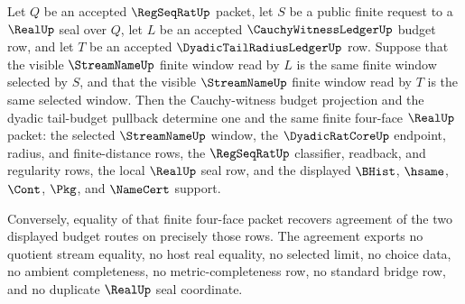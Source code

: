 \begin{theorem}
\label{thm:real-regseqrat-tail-witness-budget-agreement}
Let $Q$ be an accepted $\RegSeqRatUp$ packet, let $S$ be a public finite request to a $\RealUp$ seal over $Q$, let $L$ be an accepted $\CauchyWitnessLedgerUp$ budget row, and let $T$ be an accepted $\DyadicTailRadiusLedgerUp$ row. Suppose that the visible $\StreamNameUp$ finite window read by $L$ is the same finite window selected by $S$, and that the visible $\StreamNameUp$ finite window read by $T$ is the same selected window. Then the Cauchy-witness budget projection and the dyadic tail-budget pullback determine one and the same finite four-face $\RealUp$ packet: the selected $\StreamNameUp$ window, the $\DyadicRatCoreUp$ endpoint, radius, and finite-distance rows, the $\RegSeqRatUp$ classifier, readback, and regularity rows, the local $\RealUp$ seal row, and the displayed $\BHist$, $\hsame$, $\Cont$, $\Pkg$, and $\NameCert$ support.

Conversely, equality of that finite four-face packet recovers agreement of the two displayed budget routes on precisely those rows. The agreement exports no quotient stream equality, no host real equality, no selected limit, no choice data, no ambient completeness, no metric-completeness row, no standard bridge row, and no duplicate $\RealUp$ seal coordinate.
\end{theorem}
